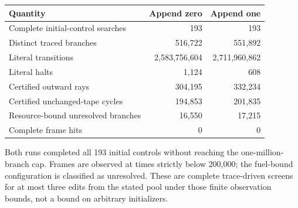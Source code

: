 \begin{center}\small
\begin{tabular}{lrr}
\toprule
Quantity & Append zero & Append one\\
\midrule
Complete initial-control searches & 193 & 193\\
Distinct traced branches & 516,722 & 551,892\\
Literal transitions & 2,583,756,604 & 2,711,960,862\\
Literal halts & 1,124 & 608\\
Certified outward rays & 304,195 & 332,234\\
Certified unchanged-tape cycles & 194,853 & 201,835\\
Resource-bound unresolved branches & 16,550 & 17,215\\
Complete frame hits & 0 & 0\\
\bottomrule
\end{tabular}
\end{center}
Both runs completed all 193 initial controls without reaching the one-million-branch cap. Frames are observed at times strictly below 200,000; the fuel-bound configuration is classified as unresolved. These are complete trace-driven screens for at most three edits from the stated pool under those finite observation bounds, not a bound on arbitrary initializers.
